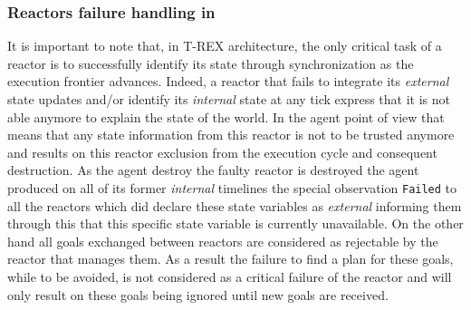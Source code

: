 \subsubsection{Reactors failure handling in \rx}
\label{sec:rx-reactor-failure}
It is important to note that, in T-REX architecture, the only critical
task of a reactor is to successfully identify its state through
synchronization as the execution frontier advances. Indeed, a reactor
that fails to integrate its {\em external} state updates and/or
identify its {\em internal} state at any tick express that it is not
able anymore to explain the state of the world. In the agent point of
view that means that any state information from this reactor is not to
be trusted anymore and results on this reactor exclusion from the
execution cycle and consequent destruction. As the agent destroy 
the  faulty reactor is destroyed the agent produced on all of 
its former {\em internal} timelines the special observation 
\texttt{Failed} to all the reactors which did declare these state 
variables as {\em external} informing
them through this that this specific state variable is currently
unavailable. On the other hand all goals exchanged between reactors
are considered as rejectable by the reactor that manages them. As a
result the failure to find a plan for these goals, while to be avoided,
is not considered as a critical failure of the reactor and will only
result on these goals being ignored until new goals are received.

